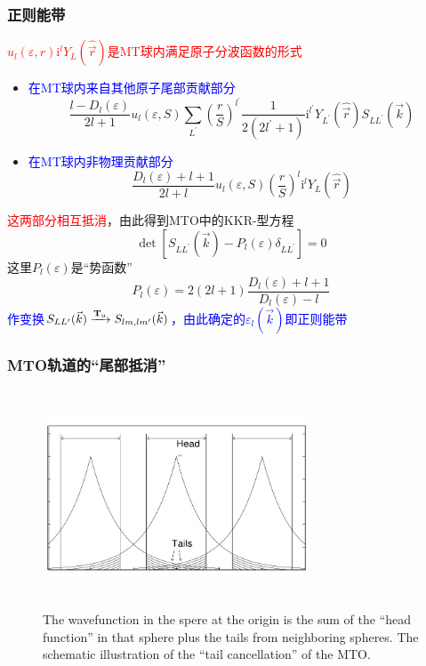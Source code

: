 \frame
{
	\frametitle{正则能带}
	\textcolor{red}{$u_l(\varepsilon,r)\mathrm{i}^lY_L(\hat{\vec r})$是\textrm{MT}球内满足原子分波函数的形式}
	\begin{itemize}
		\item \textcolor{blue}{在\textrm{MT}球内来自其他原子尾部贡献部分}$$\dfrac{l-D_l(\varepsilon)}{2l+1}u_l(\varepsilon,S)\sum_{L^{\prime}}\left(\dfrac rS\right)^{l^{\prime}}\dfrac1{2(2l^{\prime}+1)}\mathrm{i}^{l^{\prime}}Y_{L^{\prime}}(\hat{\vec r})S_{LL^{\prime}}(\vec k)$$
		\item \textcolor{blue}{在\textrm{MT}球内非物理贡献部分}$$\dfrac{D_l(\varepsilon)+l+1}{2l+l}u_l(\varepsilon,S)\left(\dfrac rS\right)^l\mathrm{i}^lY_L(\hat{\vec r})$$
	\end{itemize}
	\textcolor{red}{这两部分相互抵消}，由此得到\textrm{MTO}中的\textrm{KKR}-型方程
	\begin{displaymath}
		\det[S_{LL^{\prime}}(\vec k)-P_l(\varepsilon)\delta_{LL^{\prime}}]=0
	\end{displaymath}
	这里$P_l(\varepsilon)$是“势函数”
	\begin{displaymath}
		P_l(\varepsilon)=2(2l+1)\dfrac{D_l(\varepsilon)+l+1}{D_l(\varepsilon)-l}
	\end{displaymath}
	\textcolor{blue}{作变换$S_{LL^{\prime}}(\vec k)\xrightarrow{\bf{T}\rm{_u}}S_{lm,lm^{\prime}}(\vec k)$，由此确定的$\varepsilon_l(\vec k)$即正则能带}
}

\frame
{
	\frametitle{\textrm{MTO}轨道的“尾部抵消”}
\begin{figure}[h!]
	\vspace*{-0.7in}
\centering
\includegraphics[height=2.55in,width=3.15in,viewport=0 0 845 635,clip]{Figures/MTO-Tail_cancellation.png}
\caption{\tiny \textrm{The wavefunction in the spere at the origin is the sum of the ``head function'' in that sphere plus the tails from neighboring spheres. The schematic illustration of the ``tail cancellation'' of the MTO.}}%
\label{MTO-tail-candellation}
\end{figure}
}

